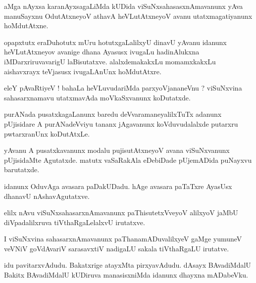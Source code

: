 \documentclass{article}
\begin{document}
\begin{mn}%
aMga nAyxsa karanAyxsagaLiMda kUDida viSuNxsahasasxnAmavanunx yAva manuSayxnu OdutAtxneyoV athavA 
heVLutAtxneyoV avanu utatxmagatiyanunx hoMdutAtxne.
\end{mn}

\begin{mn}%
opapxtutx eraDuhotutx mUru hotutxgaLalilxyU dinavU yAvanu idanunx heVLutAtxneyov avanige dhana 
Ayasusx ivugaLu hadinAlukxna iMDarxriruvavarigU laBisutatxve. alalxdemakakxLu momamxkakxLu 
aishavxrayx teVjasusx ivugaLAnUnx hoMdutAtxre.
\end{mn}

\begin{mn}%
eleY pAvaRtiyeV ! bahaLa heVLuvudariMda parxyoVjananeVnu ? viSuNxvina sahasarxnamavu utatxmavAda 
moVkaSxvanunx koDutatxde.
\end{mn}

\begin{mn}%
purANada pusatxkagaLanunx baredu deVvaramaneyalilxTuTx adanunx pUjisidare A purANadeVviyu tananx 
jAgavanunx koVduvudalalxde putarxru pwtarxranUnx koDutAtxLe.
\end{mn}

\begin{mn}%
yAvanu A pusatxkavanunx modalu pujisutAtxneyoV avana viSuNxvanunx pUjisidaMte Agutatxde. matutx 
vaSaRakAla eDebiDade pUjemADida puNayxvu barutatxde.
\end{mn}

\begin{mn}%
idanunx OduvAga avasara paDakUDadu. hAge avasara paTaTxre AyasUsx dhanavU nAshavAgutatxve.
\end{mn}

\begin{mn}%
elilx nAvu viSuNxsahasarxnAmavanunx paThisutetxVveyoV alilxyoV jaMbU diVpadalilxruva 
tiVthaRgaLelalxvU irutatxve.
\end{mn}

\begin{mn}%
I viSuNxvina sahasarxnAmavanunx paThanamADuvalilxyeV gaMge yumuneV veVNiV goVdAvariV sarasavxtiV 
nadigaLU sakala tiVthaRgaLU irutatve.
\end{mn}

\begin{mn}%
idu pavitarxvAdudu. Bakatxrige atayxMta pirxyavAdudu. dAsayx BAvadiMdalU Bakitx BAvadiMdalU 
kUDiruva manasisxniMda idanunx dhayxna mADabeVku.
\end{mn}
\end{document}
